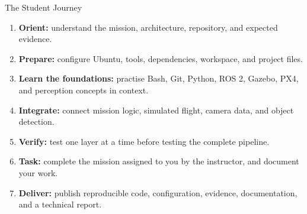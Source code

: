 \begin{frame}{The Student Journey}
    \begin{enumerate}
        \setlength{\itemsep}{0.35em}
        \item \textbf{Orient:} understand the mission, architecture, repository, and expected evidence.
        \item \textbf{Prepare:} configure Ubuntu, tools, dependencies, workspace, and project files.
        \item \textbf{Learn the foundations:} practise Bash, Git, Python, ROS 2, Gazebo, PX4, and perception concepts in context.
        \item \textbf{Integrate:} connect mission logic, simulated flight, camera data, and object detection.
        \item \textbf{Verify:} test one layer at a time before testing the complete pipeline.
        \item \textbf{Task:} complete the mission assigned to you by the instructor, and document your work.
        \item \textbf{Deliver:} publish reproducible code, configuration, evidence, documentation, and a technical report.
    \end{enumerate}
\end{frame}

